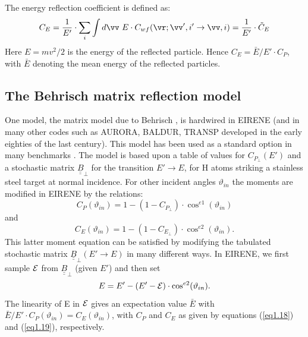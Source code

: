 The energy reflection coefficient is defined as:
\begin{equation}
C_E    =    \frac{1}{E '}    \cdot \sum_{i}   \int d \vv
\   E    \cdot C_{wf} (\vr ; \vv ' , i '
\rightarrow   \vv ,i)   =
 \frac{1}{E '}     \cdot   {\tilde{C}}_E
\label{eq1.17}
\end{equation}
Here $E = m v^2 / 2$ is the energy of the reflected particle.
Hence $C_E = \bar {E}/E' \cdot C_P$, with $\bar {E}$ denoting the
mean energy of the reflected particles.

\subsection{The Behrisch matrix reflection model} \label{sec1.3.1}
One model, the matrix model due to Behrisch \cite{kn:Behrisch}, is
hardwired in EIRENE (and in many other codes such as AURORA,
BALDUR, TRANSP developed in the early eighties of the last century).
 This model has been used as a standard option in
many benchmarks \cite{kn:Benchmark}. The model is based upon a
table of values for $ C_{P_\perp} (E ')$ and a stochastic matrix $
{\underline{\underline{B}}}_{\perp}$ for the transition $ E '
\rightarrow   E$, for H atoms striking a stainless steel target at
normal incidence. For other incident angles $ \vartheta_{in}$ the
moments are modified in EIRENE by the relations:
\begin{equation}
C_P ( \vartheta_{in} )   =   1   - (   1   -   C_{P_\perp})
 \cdot   \cos^{e1} ( \vartheta_{in} )
\label{eq1.18}
\end{equation}
and
\begin{equation}
C_E ( \vartheta_{in} )   =
  1   -   (   1   -   C_{E_\perp})
 \cdot   \cos^{e2} ( \vartheta_{in} )    .
\label{eq1.19}
\end{equation}
This latter moment equation can be satisfied by modifying the
tabulated stochastic matrix $ {\underline{\underline{B}}}_{\perp}
( E ' \rightarrow   E)$ in many different ways. In EIRENE, we
first sample $ {\cal{E}}$ from $ {\underline{\underline{B}}}
_{\perp}$ (given $ E '$) and then set
\begin{equation}
E   =   E '   -   (   E ' - {\cal{E}}  )
 \cdot   \cos^{e2} ( \vartheta_{in} )    .
\label{eq1.20}
\end{equation}
The linearity of E in $ {\cal{E}}$ gives an expectation value $\bar
{E}$ with $ \bar {E} / E ' \cdot C_P( \vartheta_{in} )  = C_E (
\vartheta_{in} )$, with $C_P $ and $C_E$ as given by equations
(\ref{eq1.18}) and (\ref{eq1.19}), respectively.

